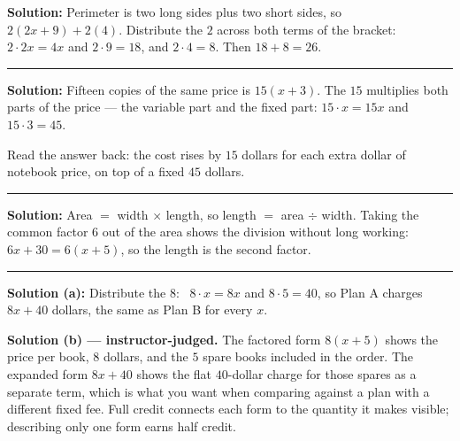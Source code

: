 \documentclass[12pt]{article}
\begin{document}



\textbf{Solution:} \quad Perimeter is two long sides plus two short sides, so
$2(2x + 9) + 2(4)$. Distribute the $2$ across both terms of the bracket:
$2\cdot 2x = 4x$ and $2\cdot 9 = 18$, and $2\cdot 4 = 8$. Then $18 + 8 = 26$. 

\vspace{0.15cm}\noindent\rule{\linewidth}{0.2pt}


\textbf{Solution:} \quad Fifteen copies of the same price is $15(x + 3)$. The $15$ multiplies both
parts of the price --- the variable part and the fixed part:
$15\cdot x = 15x$ and $15\cdot 3 = 45$. 

\noindent Read the answer back: the cost rises by $15$ dollars for each extra dollar of notebook
price, on top of a fixed $45$ dollars.

\vspace{0.15cm}\noindent\rule{\linewidth}{0.2pt}


\textbf{Solution:} \quad Area $=$ width $\times$ length, so length $=$ area $\div$ width. Taking the
common factor $6$ out of the area shows the division without long working:
$6x + 30 = 6(x + 5)$, so the length is the second factor. 

\vspace{0.15cm}\noindent\rule{\linewidth}{0.2pt}


\textbf{Solution (a):} \quad Distribute the $8$: \ $8\cdot x = 8x$ and $8\cdot 5 = 40$, so
Plan A charges $8x + 40$ dollars, the same as Plan B for every $x$. 

\noindent\textbf{Solution (b) --- instructor-judged.} The factored form $8(x + 5)$ shows the price
per book, $8$ dollars, and the $5$ spare books included in the order. The expanded form
$8x + 40$ shows the flat $40$-dollar charge for those spares as a separate term, which is what you
want when comparing against a plan with a different fixed fee. Full credit connects each form to
the quantity it makes visible; describing only one form earns half credit.
\end{document}
